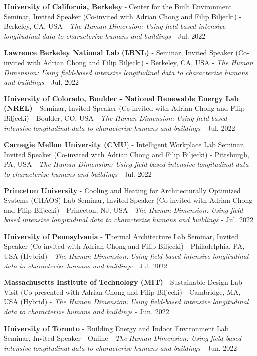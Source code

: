 \documentclass[10pt,a4paper]{article}
\begin{document}
\begin{small}
\begin{etaremune}
\item
\textbf{University of California, Berkeley} - Center for the Built Environment Seminar, Invited Speaker (Co-invited with Adrian Chong and Filip Biljecki) - Berkeley, CA, USA - \emph{The Human Dimension: Using field-based intensive longitudinal data to characterize humans and buildings} - Jul. 2022
\item
\textbf{Lawrence Berkeley National Lab (LBNL)} - Seminar, Invited Speaker (Co-invited with Adrian Chong and Filip Biljecki) - Berkeley, CA, USA - \emph{The Human Dimension: Using field-based intensive longitudinal data to characterize humans and buildings} - Jul. 2022
\item
\textbf{University of Colorado, Boulder - National Renewable Energy Lab (NREL)} - Seminar, Invited Speaker (Co-invited with Adrian Chong and Filip Biljecki) - Boulder, CO, USA - \emph{The Human Dimension: Using field-based intensive longitudinal data to characterize humans and buildings} - Jul. 2022
\item
\textbf{Carnegie Mellon University (CMU)} - Intelligent Workplace Lab Seminar, Invited Speaker (Co-invited with Adrian Chong and Filip Biljecki) - Pittsburgh, PA, USA - \emph{The Human Dimension: Using field-based intensive longitudinal data to characterize humans and buildings} - Jul. 2022
\item
\textbf{Princeton University} - Cooling and Heating for Architecturally Optimized Systems (CHAOS) Lab Seminar, Invited Speaker (Co-invited with Adrian Chong and Filip Biljecki) - Princeton, NJ, USA - \emph{The Human Dimension: Using field-based intensive longitudinal data to characterize humans and buildings} - Jul. 2022
\item
\textbf{University of Pennsylvania} - Thermal Architecture Lab Seminar, Invited Speaker (Co-invited with Adrian Chong and Filip Biljecki) - Philadelphia, PA, USA (Hybrid) - \emph{The Human Dimension: Using field-based intensive longitudinal data to characterize humans and buildings} - Jul. 2022
\item
\textbf{Massachusetts Institute of Technology (MIT)} - Sustainable Design Lab Visit (Co-presented with Adrian Chong and Filip Biljecki) - Cambridge, MA, USA (Hybrid) - \emph{The Human Dimension: Using field-based intensive longitudinal data to characterize humans and buildings} - Jun. 2022
\item
\textbf{University of Toronto} - Building Energy and Indoor Environment Lab Seminar, Invited Speaker - Online - \emph{The Human Dimension: Using field-based intensive longitudinal data to characterize humans and buildings} - Jun. 2022

\end{etaremune}
\end{small}
\end{document}
